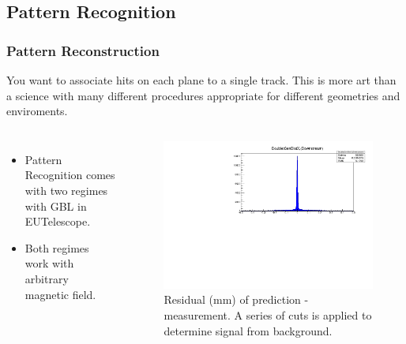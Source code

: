 \documentclass{beamer}
\begin{document}
\subsection{Pattern Recognition}
\begin{frame}
\frametitle{Pattern Reconstruction}
You want to associate hits on each plane to a single track. This is more art than a science with many different procedures appropriate for different geometries and enviroments. 
\begin{columns}
\begin{itemize}
\item Pattern Recognition comes with two regimes with GBL in EUTelescope.
\item Both regimes work with arbitrary magnetic field.
\end{itemize}
\begin{figure}
\includegraphics[scale=0.30]{pics/DoubletCenDist-442.pdf}	
\caption{\small{ Residual (mm) of prediction - measurement. A series of cuts is applied to determine signal from background.}}
\end{figure}
\end{columns}
\end{frame}
\end{document}
